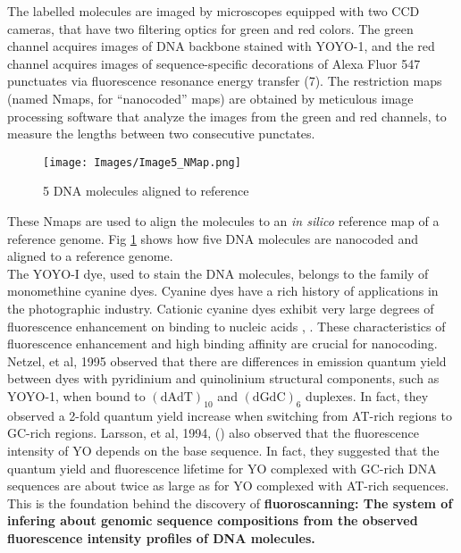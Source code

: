 The labelled molecules are imaged by microscopes equipped with two CCD cameras, that have two filtering optics for green and red colors. The green channel acquires images of DNA backbone stained with YOYO-1, and the red channel acquires images of sequence-specific decorations of Alexa Fluor 547 punctuates via fluorescence resonance energy transfer (7). The restriction maps (named Nmaps, for ``nanocoded'' maps) are obtained by meticulous image processing software that analyze the images from the green and red channels, to measure the lengths between two consecutive punctates. 

\begin{figure}[H]
\begin{center}
\texttt{[image: Images/Image5\_NMap.png]}
\end{center}
\caption{5 DNA molecules aligned to reference}
\label{fig:Fig2_NMap}
\end{figure}

These Nmaps are used to align the molecules to an {\emph{in silico}} reference map of a reference genome. Fig \ref{fig:Fig2_NMap} shows how five DNA molecules are nanocoded and aligned to a reference genome. \\

The YOYO-I dye, used to stain the DNA molecules, belongs to the family of monomethine cyanine dyes. Cyanine dyes have a rich history of applications in the photographic industry. Cationic cyanine dyes exhibit very large degrees of fluorescence enhancement on binding to nucleic acids \cite{Rye_etal_1992_NAR}, \cite{Lee_etal_1986_Cytometry}. These characteristics of fluorescence enhancement and high binding affinity are crucial for nanocoding. Netzel, et al, 1995 \cite{Netzel_etal_1995_JPC} observed that there are differences in emission quantum yield between dyes with pyridinium and quinolinium structural components, such as YOYO-1, when bound to $(\text{dAdT})_{10}$ and $(\text{dGdC})_6$ duplexes. In fact, they observed a 2-fold quantum yield increase when switching from AT-rich regions to GC-rich regions. Larsson, et al, 1994, (\cite{Larsson_etal_1994_JACS}) also observed that the fluorescence intensity of YO depends on the base sequence. In fact, they suggested that the quantum yield and fluorescence lifetime for YO complexed with GC-rich DNA sequences are about twice as large as for YO complexed with AT-rich sequences. This is the foundation behind the discovery of {\bf{fluoroscanning: The system of infering about genomic sequence compositions from the observed fluorescence intensity profiles of DNA molecules.}} 

